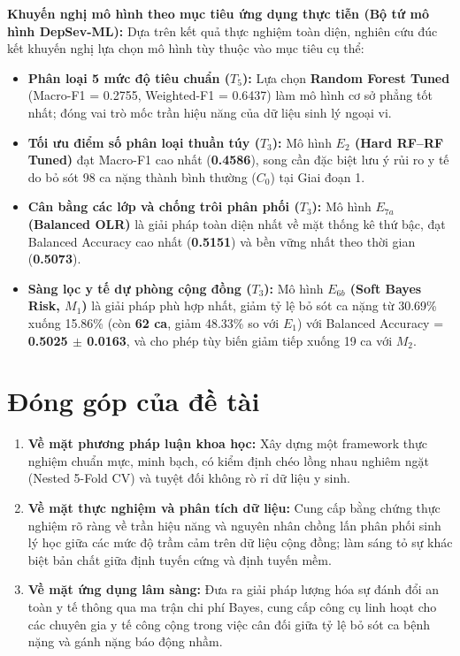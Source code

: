 \textbf{Khuyến nghị mô hình theo mục tiêu ứng dụng thực tiễn (Bộ tứ mô hình DepSev-ML):}
Dựa trên kết quả thực nghiệm toàn diện, nghiên cứu đúc kết khuyến nghị lựa chọn mô hình tùy thuộc vào mục tiêu cụ thể:
\begin{itemize}
    \item \textbf{Phân loại 5 mức độ tiêu chuẩn ($T_5$):} Lựa chọn \textbf{Random Forest Tuned} (Macro-F1 = 0.2755, Weighted-F1 = 0.6437) làm mô hình cơ sở phẳng tốt nhất; đóng vai trò mốc trần hiệu năng của dữ liệu sinh lý ngoại vi.
    \item \textbf{Tối ưu điểm số phân loại thuần túy ($T_3$):} Mô hình \textbf{$E_2$ (Hard RF--RF Tuned)} đạt Macro-F1 cao nhất (\textbf{0.4586}), song cần đặc biệt lưu ý rủi ro y tế do bỏ sót 98 ca nặng thành bình thường ($C_0$) tại Giai đoạn 1.
    \item \textbf{Cân bằng các lớp và chống trôi phân phối ($T_3$):} Mô hình \textbf{$E_{7a}$ (Balanced OLR)} là giải pháp toàn diện nhất về mặt thống kê thứ bậc, đạt Balanced Accuracy cao nhất (\textbf{0.5151}) và bền vững nhất theo thời gian (\textbf{0.5073}).
    \item \textbf{Sàng lọc y tế dự phòng cộng đồng ($T_3$):} Mô hình \textbf{$E_{6b}$ (Soft Bayes Risk, $M_1$)} là giải pháp phù hợp nhất, giảm tỷ lệ bỏ sót ca nặng từ 30.69\% xuống 15.86\% (còn \textbf{62 ca}, giảm 48.33\% so với $E_1$) với Balanced Accuracy = \textbf{0.5025 $\pm$ 0.0163}, và cho phép tùy biến giảm tiếp xuống 19 ca với $M_2$.
\end{itemize}

\section{Đóng góp của đề tài}
\label{sec:dong-gop-de-tai}

\begin{enumerate}
    \item \textbf{Về mặt phương pháp luận khoa học:} Xây dựng một framework thực nghiệm chuẩn mực, minh bạch, có kiểm định chéo lồng nhau nghiêm ngặt (Nested 5-Fold CV) và tuyệt đối không rò rỉ dữ liệu y sinh.
    \item \textbf{Về mặt thực nghiệm và phân tích dữ liệu:} Cung cấp bằng chứng thực nghiệm rõ ràng về trần hiệu năng và nguyên nhân chồng lấn phân phối sinh lý học giữa các mức độ trầm cảm trên dữ liệu cộng đồng; làm sáng tỏ sự khác biệt bản chất giữa định tuyến cứng và định tuyến mềm.
    \item \textbf{Về mặt ứng dụng lâm sàng:} Đưa ra giải pháp lượng hóa sự đánh đổi an toàn y tế thông qua ma trận chi phí Bayes, cung cấp công cụ linh hoạt cho các chuyên gia y tế công cộng trong việc cân đối giữa tỷ lệ bỏ sót ca bệnh nặng và gánh nặng báo động nhầm.
\end{enumerate}

